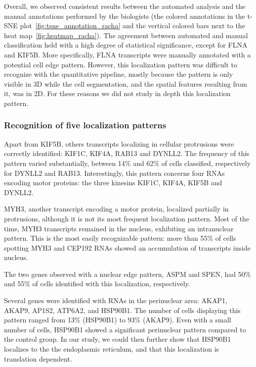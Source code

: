 Overall, we observed consistent results between the automated analysis and the manual annotations performed by the biologists (the colored annotations in the \ac{t-SNE} plot~\ref{fig:tsne_annotation_racha} and the vertical colored bars next to the heat map~\ref{fig:heatmap_racha}).
The agreement between automated and manual classification held with a high degree of statistical significance, except for FLNA and KIF5B.
More specifically, FLNA transcripts were manually annotated with a potential cell edge pattern.
However, this localization pattern was difficult to recognize with the quantitative pipeline, mostly because the pattern is only visible in 3D while the cell segmentation, and the spatial features resulting from it, was in 2D.
For these reasons we did not study in depth this localization pattern.

\subsubsection{Recognition of five localization patterns}

Apart from KIF5B, others transcripts localizing in cellular  protrusions were correctly identified: KIF1C, KIF4A, RAB13 and DYNLL2.
The frequency of this pattern varied substantially, between 14\% and 62\% of cells classified, respectively for DYNLL2 and RAB13.
Interestingly, this pattern concerns four \ac{RNA}s encoding motor proteins: the three kinesins KIF1C, KIF4A, KIF5B and DYNLL2.

MYH3, another transcript encoding a motor protein, localized partially in protrusions, although it is not its most frequent localization pattern.
Most of the time, MYH3 transcripts remained in the nucleus, exhibiting an intranuclear pattern.
This is the most easily recognizable pattern: more than 55\% of cells spotting MYH3 and CEP192 \ac{RNA}s showed an accumulation of transcripts inside nucleus.

The two genes observed with a nuclear edge pattern, ASPM and SPEN, had 50\% and 55\% of cells identified with this localization, respectively.

Several genes were identified with \ac{RNA}s in the perinuclear area: AKAP1, AKAP9, AP1S2, ATP6A2, and HSP90B1.
The number of cells displaying this pattern ranged from 13\% (HSP90B1) to 93\% (AKAP9).
Even with a small number of cells, HSP90B1 showed a significant perinuclear pattern compared to the control group.
In our study, we could then further show that HSP90B1 localizes to the the endoplasmic reticulum, and that this localization is translation dependent.

